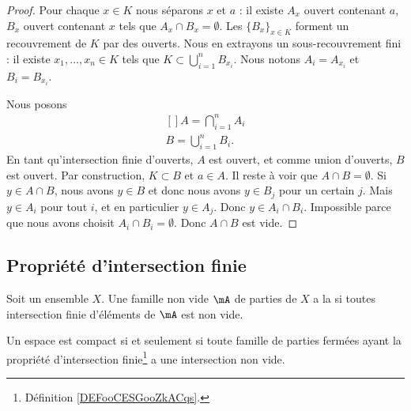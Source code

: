 \begin{proof}
	Pour chaque \( x\in K\) nous séparons \( x\) et \( a\) : il existe \( A_x\) ouvert contenant \( a\), \( B_x\) ouvert contenant \( x\) tels que \( A_x\cap B_x=\emptyset\). Les \( \{ B_x \}_{x\in K}\) forment un recouvrement de \( K \) par des ouverts. Nous en extrayons un sous-recouvrement fini : il existe \( x_1,\ldots,x_n\in K\) tels que \( K\subset\bigcup_{i=1}^nB_{x_i}\). Nous notons \( A_i=A_{x_i}\) et \( B_i=B_{x_i}\).

	Nous posons
	\begin{equation}
		\begin{aligned}[]
			A=\bigcap_{i=1}^nA_i \\
			B=\bigcup_{i=1}^nB_i.
		\end{aligned}
	\end{equation}
	En tant qu'intersection finie d'ouverts, \( A\) est ouvert, et comme union d'ouverts, \( B\) est ouvert. Par construction, \( K\subset B\) et \( a\in A\). Il reste à voir que \( A\cap B=\emptyset\). Si \( y\in A\cap B\), nous avons \( y\in B\) et donc nous avons \( y\in B_j\) pour un certain \( j\). Mais \( y\in A_i\) pour tout \( i\), et en particulier \( y\in A_j\). Donc \( y\in A_i\cap B_i\). Impossible parce que nous avons choisit \( A_i\cap B_i=\emptyset\). Donc \( A\cap B\) est vide.
\end{proof}


\subsection{Propriété d'intersection finie}

\begin{definition}      \label{DEFooCESGooZkACqs}
	Soit un ensemble \( X\). Une famille non vide \( \mA\) de parties de \( X\) a la  si toutes intersection finie d'éléments de \( \mA\) est non vide.
\end{definition}

\begin{theorem}       \label{THOooCQSQooDuasqo}
	Un espace est compact si et seulement si toute famille de parties fermées ayant la propriété d'intersection finie\footnote{Définition \ref{DEFooCESGooZkACqs}.} a une intersection non vide.
\end{theorem}

